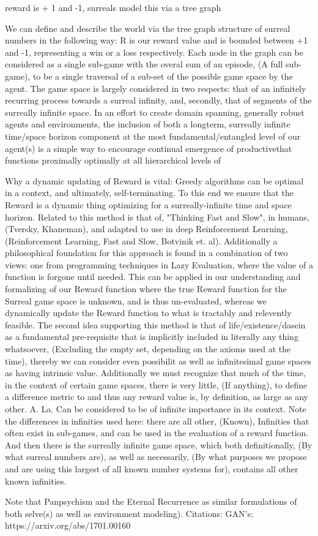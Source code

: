 \documentclass{article}
\begin{document}
reward is + 1 and -1, surreals model this via a tree graph

We can define and describe the world via the tree graph structure of surreal numbers in the following way: R is our reward value and is bounded between +1 and -1, representing a win or a loss respectively. Each node in the graph can be considered as a single sub-game with the overal sum of an episode, (A full sub-game), to be a single traversal of a sub-set of the possible game space by the agent. The game space is largely considered in two respects: that of an infinitely recurring process towards a surreal infinity, and, secondly, that of segments of the surreally infinite space. In an effort to create domain spanning, generally robust agents and environments, the inclusion of both a longterm, surreally infinite time/space horizon component at the most fundamental/entangled level of our agent(s) is a simple way to encourage continual emergence of productivethat functions proximally optimally at all hierarchical levels of 

Why a dynamic updating of Reward is vital: Greedy algorithms can be optimal in a context, and ultimately, self-terminating. To this end we ensure that the Reward is a dynamic thing optimizing for a surreally-infinite time and space horizon. Related to this method is that of, "Thinking Fast and Slow", in humans, (Tversky, Khaneman), and adapted to use in deep Reinforcement Learning, (Reinforcement Learning, Fast and Slow, Botvinik et. al). Additionally a philosophical foundation for this approach is found in a combination of two views: one from programming techniques in Lazy Evaluation, where the value of a function is forgone until needed. This can be applied in our understanding and formalizing of our Reward function where the true Reward function for the Surreal game space is unknown, and is thus un-evaluated, whereas we dynamically update the Reward function to what is tractably and relevently feasible. The second idea supporting this method is that of life/existence/dasein as a fundamental pre-requisite that is implicitly included in literally any thing whatsoever, (Excluding the empty set, depending on the axioms used at the time), thereby we can consider even possibilit as well as infinitesimal game spaces as having intrinsic value. Additionally we must recognize that much of the time, in the context of certain game spaces, there is very little, (If anything), to define a difference metric to and thus any reward value is, by definition, as large as any other. A. La. Can be considered to be of infinite importance in its context. Note the differences in infinities used here: there are all other, (Known), Infinities that often exist in sub-games, and can be used in the evaluation of a reward function. And then there is the surreally infinite game space, which both definitionally, (By what surreal numbers are), as well as necessarily, (By what purposes we propose and are using this largest of all known number systems for), contains all other known infinities. 

Note that Panpsychism and the Eternal Recurrence as similar formulations of both selve(s) as well as environment modeling).
Citations: 
GAN's: https://arxiv.org/abs/1701.00160
\end{document}
